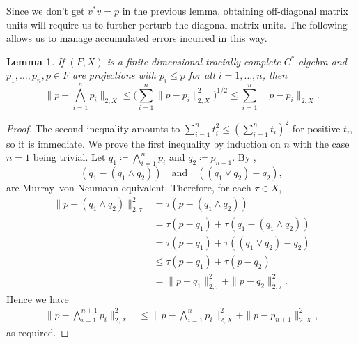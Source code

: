 \documentclass[a4paper,11pt]{amsart}
\newtheorem{lemma}[theorem]{Lemma}
\theoremstyle{definition}
\numberwithin{equation}{section}
\numberwithin{theorem}{section}
\begin{document}
Since we don't get $v^*v=p$ in the previous lemma, obtaining off-diagonal matrix units will require us to further perturb the diagonal matrix units.
The following allows us to manage accumulated errors incurred in this way.

\begin{lemma}
	\label{lem:meet-of-subprojections}
	If $(F, X)$ is a finite dimensional tracially complete $C^*$-algebra and $p_1, \ldots, p_n, p \in F$ are projections with $p_i \leq p$ for all $i = 1, \ldots, n$, then
	\begin{equation}\label{eqn:p-minus-meet}
		\Big\| p - \bigwedge_{i=1}^n p_i \Big\|_{2, X} \leq \Big( \sum_{i=1}^n \| p - p_i \|_{2, X}^2 \Big)^{1/2} \leq \sum_{i=1}^n \|p - p_i\|_{2, X}.
	\end{equation}
\end{lemma}

\begin{proof}
	The second inequality amounts to $\sum_{i=1}^nt_i^2\leq(\sum_{i=1}^nt_i)^2$ for positive $t_i$, so it is immediate.  We prove the first inequality by induction on $n$ with the case $n = 1$ being trivial.  Let $q_1 \coloneqq \bigwedge_{i=1}^n p_i$ and $q_2 \coloneqq p_{n+1}$.  By \cite[Proposition~III.1.1.3]{Bl06},
	\begin{equation}
		(q_1 - (q_1 \wedge q_2)) \quad \text{and}\quad ((q_1 \vee q_2) - q_2),
	\end{equation}
	are Murray--von Neumann equivalent.	Therefore, for each $\tau \in X$,
	\begin{equation}\begin{split}
		\|p - (q_1 \wedge q_2)\|_{2, \tau}^2 
		&= \tau(p - (q_1 \wedge q_2)) \\
		&= \tau(p - q_1) + \tau(q_1 - (q_1 \wedge q_2)) \\
		&= \tau(p - q_1) + \tau((q_1 \vee q_2) - q_2) \\
		&\leq \tau(p - q_1) + \tau(p - q_2) \\
		&= \|p - q_1\|_{2, \tau}^2 + \|p - q_2\|_{2, \tau}^2. 
	\end{split}\end{equation}
	Hence we have
	\begin{equation}\begin{split}
		\Big\| p - \bigwedge_{i=1}^{n+1} p_i \Big\|_{2, X}^2
		&\leq \Big\| p - \bigwedge_{i=1}^{n} p_i \Big\|_{2, X}^2 + \|p - p_{n+1}\|_{2, X}^2,
	\end{split}\end{equation}	
	as required.
\end{proof}
\end{document}
